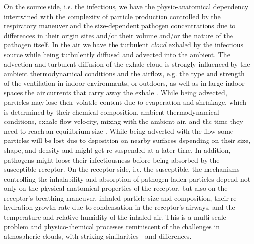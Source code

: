 \documentclass[preprint]{elsarticle}
\begin{document}
On the source side, i.e. the infectious,  we have the physio-anatomical dependency  intertwined with the complexity of particle production controlled by the respiratory maneuver and the size-dependent pathogen concentrations due to differences in their origin sites and/or their volume and/or the nature of the pathogen itself.
In the air we have the turbulent \emph{cloud} exhaled by the infectious source while being turbulently diffused and advected into the ambient.
The advection and turbulent diffusion of the exhale cloud is strongly influenced by the ambient thermodynamical conditions and the airflow, e.g. the type and strength of the ventilation in indoor environments, or outdoors, as well as in large indoor spaces the air currents that carry away the exhale \cite{Hejazi2021}.
While being advected, particles may lose their volatile content due to evaporation and shrinkage, which is determined by their chemical composition, ambient thermodynamical conditions, exhale flow velocity, mixing with the ambient air, and the time they need to reach an equilibrium size \cite{Chong_2021,Pohlker2021}.
While being advected with the flow some particles will be lost due to deposition on nearby surfaces depending on their size, shape, and density and might get re-suspended at a later time.
In addition, pathogens might loose their infectiousness before being absorbed by the susceptible receptor.
On the receptor side, i.e. the susceptible, the mechanisms controlling the inhalability and absorption of pathogen-laden particles depend not only on the physical-anatomical properties of the receptor, but also on the receptor's breathing maneuver, inhaled particle size and composition, their re-hydration growth rate due to condensation in the receptor's airways, and the temperature and relative humidity of the inhaled air.
This is a multi-scale problem and physico-chemical processes reminiscent of the challenges in atmospheric clouds, with striking similarities - and differences. 
\end{document}
